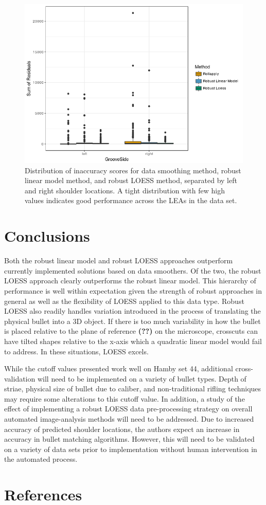 \documentclass[12pt]{article}
\begin{document}
\begin{figure}
\centering
\includegraphics{./images/afte_results.png}
\caption{Distribution of inaccuracy scores for data smoothing method,
robust linear model method, and robust LOESS method, separated by left
and right shoulder locations. A tight distribution with few high values
indicates good performance across the LEAs in the data set.}
\end{figure}

\section{Conclusions}

Both the robust linear model and robust LOESS approaches outperform
currently implemented solutions based on data smoothers. Of the two, the
robust LOESS approach clearly outperforms the robust linear model. This
hierarchy of performance is well within expectation given the strength
of robust approaches in general as well as the flexibility of LOESS
applied to this data type. Robust LOESS also readily handles variation
introduced in the process of translating the physical bullet into a 3D
object. If there is too much variability in how the bullet is placed
relative to the plane of reference \textbf{(??)} on the microscope,
crosscuts can have tilted shapes relative to the x-axis which a
quadratic linear model would fail to address. In these situations, LOESS
excels.

While the cutoff values presented work well on Hamby set 44, additional
cross-validation will need to be implemented on a variety of bullet
types. Depth of striae, physical size of bullet due to caliber, and
non-traditional rifling techniques may require some alterations to this
cutoff value. In addition, a study of the effect of implementing a
robust LOESS data pre-processing strategy on overall automated
image-analysis methods will need to be addressed. Due to increased
accuracy of predicted shoulder locations, the authors expect an increase
in accuracy in bullet matching algorithms. However, this will need to be
validated on a variety of data sets prior to implementation without
human intervention in the automated process.

\section{References}



\end{document}
